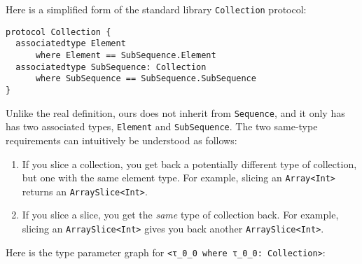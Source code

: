 \documentclass[../generics]{subfiles}
\begin{document}
\begin{example} Here is a simplified form of the standard library \texttt{Collection} protocol:
\begin{Verbatim}
protocol Collection {
  associatedtype Element
      where Element == SubSequence.Element
  associatedtype SubSequence: Collection
      where SubSequence == SubSequence.SubSequence
}
\end{Verbatim}
Unlike the real definition, ours does not inherit from \texttt{Sequence}, and it only has has two associated types, \texttt{Element} and \texttt{SubSequence}. The two same-type requirements can intuitively be understood as follows:
\begin{enumerate}
\item If you slice a collection, you get back a potentially different type of collection, but one with the same element type. For example, slicing an \texttt{Array<Int>} returns an \texttt{ArraySlice<Int>}.
\item If you slice a slice, you get the \emph{same} type of collection back. For example, slicing an \texttt{ArraySlice<Int>} gives you back another \texttt{ArraySlice<Int>}.
\end{enumerate}
Here is the type parameter graph for \verb|<τ_0_0 where τ_0_0: Collection>|:
\begin{quote}
\end{quote}
\end{example}
\end{document}
